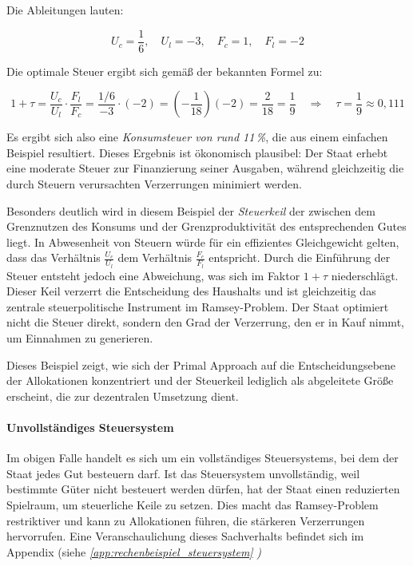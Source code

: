 Die Ableitungen lauten:

\[
U_c = \frac{1}{6}, \quad U_l = -3, \quad F_c = 1, \quad F_l = -2
\]

Die optimale Steuer ergibt sich gemä{\ss} der bekannten Formel zu:

\[
1 + \tau = \frac{U_c}{U_l} \cdot \frac{F_l}{F_c}
= \frac{1/6}{-3} \cdot (-2) = \left(-\frac{1}{18}\right)(-2) = \frac{2}{18} = \frac{1}{9}
\quad \Rightarrow \quad \tau = \frac{1}{9} \approx 0{,}111
\]

Es ergibt sich also eine \textit{ Konsumsteuer von rund 11\,\%}, die aus einem einfachen Beispiel resultiert. Dieses Ergebnis ist ökonomisch plausibel: Der Staat erhebt eine moderate Steuer zur Finanzierung seiner Ausgaben, während gleichzeitig die durch Steuern verursachten Verzerrungen minimiert werden.

Besonders deutlich wird in diesem Beispiel der \textit{Steuerkeil} der zwischen dem Grenznutzen des Konsums und der Grenzproduktivität des entsprechenden Gutes liegt. In Abwesenheit von Steuern würde für ein effizientes Gleichgewicht gelten, dass das Verhältnis \(\frac{U_c}{U_l}\) dem Verhältnis \(\frac{F_c}{F_l}\) entspricht. Durch die Einführung der Steuer entsteht jedoch eine Abweichung, was sich im Faktor \(1 + \tau\) niederschlägt. Dieser Keil verzerrt die Entscheidung des Haushalts und ist gleichzeitig das zentrale steuerpolitische Instrument im Ramsey-Problem. Der Staat optimiert nicht die Steuer direkt, sondern den Grad der Verzerrung, den er in Kauf nimmt, um Einnahmen zu generieren.

Dieses Beispiel zeigt, wie sich der Primal Approach auf die Entscheidungsebene der Allokationen konzentriert und der Steuerkeil lediglich als abgeleitete Grö{\ss}e erscheint, die zur dezentralen Umsetzung dient. 

\paragraph{Unvollständiges Steuersystem}

Im obigen Falle handelt es sich um ein vollständiges Steuersystems, bei dem der Staat jedes Gut besteuern darf. Ist das Steuersystem unvollständig, weil bestimmte Güter nicht besteuert werden dürfen, hat der Staat einen reduzierten Spielraum, um steuerliche Keile zu setzen. Dies macht das Ramsey-Problem restriktiver und kann zu Allokationen führen, die stärkeren Verzerrungen hervorrufen. Eine Veranschaulichung dieses Sachverhalts befindet sich im Appendix (siehe \textit{ \ref{app:rechenbeispiel_steuersystem}}  \textit{)}


